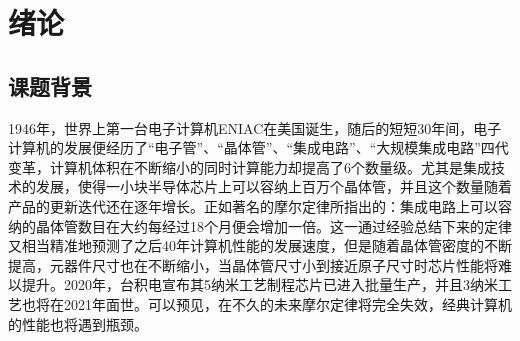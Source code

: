 
\chapter{绪论}
\label{ch1}

\section{课题背景}
1946年，世界上第一台电子计算机ENIAC在美国诞生，随后的短短30年间，电子计算机的发展便经历了“电子管”、“晶体管”、“集成电路”、“大规模集成电路”四代变革，计算机体积在不断缩小的同时计算能力却提高了6个数量级。尤其是集成技术的发展，使得一小块半导体芯片上可以容纳上百万个晶体管，并且这个数量随着产品的更新迭代还在逐年增长。正如著名的摩尔定律所指出的：集成电路上可以容纳的晶体管数目在大约每经过18个月便会增加一倍\ChangeNotation。这一通过经验总结下来的定律又相当精准地预测了之后40年计算机性能的发展速度，但是随着晶体管密度的不断提高，元器件尺寸也在不断缩小，当晶体管尺寸小到接近原子尺寸时芯片性能将难以提升。2020年，台积电宣布其5纳米工艺制程芯片已进入批量生产，并且3纳米工艺也将在2021年面世。可以预见，在不久的未来摩尔定律将完全失效，经典计算机的性能也将遇到瓶颈。


